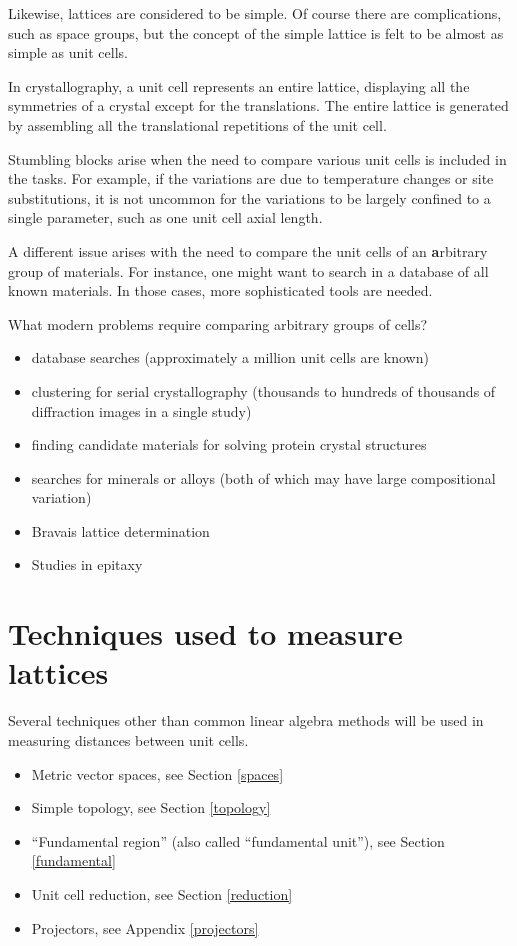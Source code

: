 \documentclass[preprint]{iucr}              %
\numberwithin{equation}{section}
\begin{document}
Likewise, lattices are considered to be simple. Of course
there are complications, such as space groups, but the concept
of the simple lattice is felt to be almost as simple as
unit cells.

In crystallography, a unit cell represents an entire lattice, displaying all the symmetries of a crystal except for the translations.  The entire lattice is generated by assembling all the translational repetitions of the unit cell.
	
Stumbling blocks arise when the need to compare various unit
cells is included in the tasks. For example, if the variations are due
to temperature changes or site substitutions, it is not
uncommon for the variations to be largely confined to a single
parameter, such as one unit cell axial length. 

A different issue arises with the need to compare the unit
cells of an \textbf{a}rbitrary group of materials. For instance, one
might want to search in a database of all known materials. In
those cases, more sophisticated tools are needed. 

What modern problems require comparing arbitrary groups of cells?
\begin{itemize}
	\item database searches (approximately a million unit cells are known)
	\item clustering for serial crystallography (thousands to hundreds of thousands of diffraction images in a single study)
	\item finding candidate materials for solving protein crystal structures 
	\cite{nanao2022id23}
	\item searches for minerals or alloys (both of which may have large compositional variation)
	\item Bravais lattice determination
	\item Studies in epitaxy \cite{yang2014unit}
\end{itemize}

	
\section{Techniques used to measure lattices}

Several techniques other than common linear algebra methods will be used in measuring distances between unit cells.
\begin{itemize}
	\item 	Metric vector spaces, see Section \ref{spaces}
	\item 	Simple topology, see Section \ref{topology}
	\item   ``Fundamental region'' (also called ``fundamental unit''),
	see Section \ref{fundamental}
	\item 	Unit cell reduction, see Section \ref{reduction}
	\item 	Projectors, see Appendix \ref{projectors}

\end{itemize}	
\end{document}
